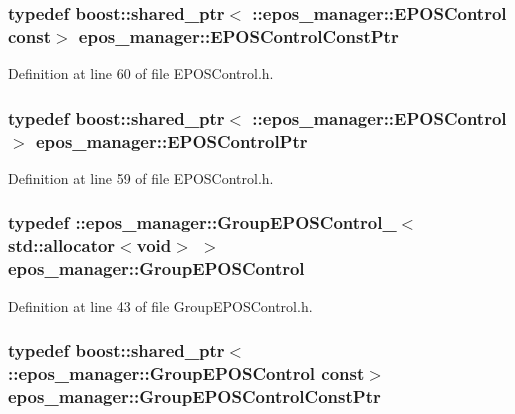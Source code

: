 \subsubsection[{\-E\-P\-O\-S\-Control\-Const\-Ptr}]{\setlength{\rightskip}{0pt plus 5cm}typedef boost\-::shared\-\_\-ptr$<$ \-::{\bf epos\-\_\-manager\-::\-E\-P\-O\-S\-Control} const$>$ {\bf epos\-\_\-manager\-::\-E\-P\-O\-S\-Control\-Const\-Ptr}}\label{namespaceepos__manager_a3652f9baeaa4345bc66619e27de16769}


\-Definition at line 60 of file \-E\-P\-O\-S\-Control.\-h.

\subsubsection[{\-E\-P\-O\-S\-Control\-Ptr}]{\setlength{\rightskip}{0pt plus 5cm}typedef boost\-::shared\-\_\-ptr$<$ \-::{\bf epos\-\_\-manager\-::\-E\-P\-O\-S\-Control}$>$ {\bf epos\-\_\-manager\-::\-E\-P\-O\-S\-Control\-Ptr}}\label{namespaceepos__manager_afbb11cfdc86548d46c42e47fcd05f20e}


\-Definition at line 59 of file \-E\-P\-O\-S\-Control.\-h.

\subsubsection[{\-Group\-E\-P\-O\-S\-Control}]{\setlength{\rightskip}{0pt plus 5cm}typedef \-::{\bf epos\-\_\-manager\-::\-Group\-E\-P\-O\-S\-Control\-\_\-}$<$std\-::allocator$<$void$>$ $>$ {\bf epos\-\_\-manager\-::\-Group\-E\-P\-O\-S\-Control}}\label{namespaceepos__manager_ae089b29f0f98c489643ea4083a3430be}


\-Definition at line 43 of file \-Group\-E\-P\-O\-S\-Control.\-h.

\subsubsection[{\-Group\-E\-P\-O\-S\-Control\-Const\-Ptr}]{\setlength{\rightskip}{0pt plus 5cm}typedef boost\-::shared\-\_\-ptr$<$ \-::{\bf epos\-\_\-manager\-::\-Group\-E\-P\-O\-S\-Control} const$>$ {\bf epos\-\_\-manager\-::\-Group\-E\-P\-O\-S\-Control\-Const\-Ptr}}\label{namespaceepos__manager_a8d4273fa91bc9ef8dfc09741ba78c484}



